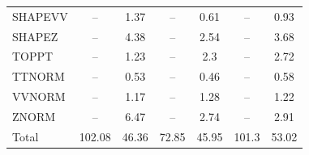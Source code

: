 \begin{table}[H]
\begin{center}
\begin{footnotesize}
\begin{tabular}{lcccccc}
				SHAPEVV & -- &  1.37 & -- &  0.61 & -- &  0.93 \\
				SHAPEZ & -- &  4.38 & -- &  2.54 & -- &  3.68 \\
				TOPPT & -- &  1.23 & -- &  2.3 & -- &  2.72 \\
				TTNORM & -- &  0.53 & -- &  0.46 & -- &  0.58 \\
				VVNORM & -- &  1.17 & -- &  1.28 & -- &  1.22 \\
				ZNORM & -- &  6.47 & -- &  2.74 & -- &  2.91 \\
				Total &  102.08  &  46.36 &  72.85  &  45.95 &  101.3  &  53.02 \\ \hline \hline
			\end{tabular}
			\label{tab:SysUncertainties_2700}
        \end{footnotesize}
	\end{center}
\end{table}


